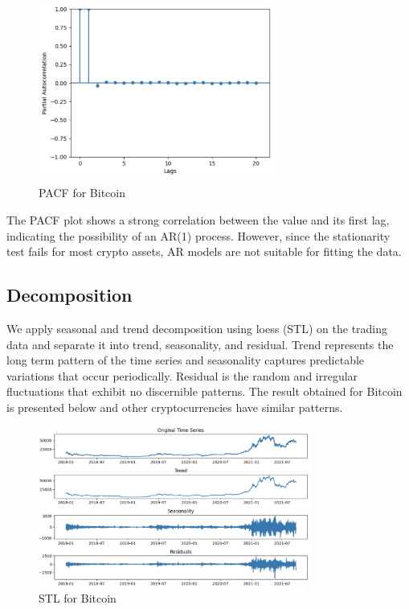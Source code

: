 \documentclass{article}
\begin{document}
\begin{figure}[H]
	\centering
	\includegraphics[width=0.7\textwidth, height=6cm]{Data/PACF plot.png}
	\caption{PACF for Bitcoin}
\end{figure}

The PACF plot shows a strong correlation between the value and its first lag, indicating the possibility of an AR(1) process. However, since the stationarity test fails for most crypto assets, AR models are not suitable for fitting the data.

\subsection{Decomposition}

We apply seasonal and trend decomposition using loess (STL) on the trading data and separate it into trend, seasonality, and residual. Trend represents the long term pattern of the time series and seasonality captures predictable variations that occur periodically. Residual is the random and irregular fluctuations  that exhibit no discernible patterns. The result obtained for Bitcoin is presented below and other cryptocurrencies have similar patterns.

\begin{figure}[H]
	\centering
	\includegraphics[width=0.8\textwidth]{Data/STL.png}
	\caption{STL for Bitcoin}
\end{figure}
\end{document}
